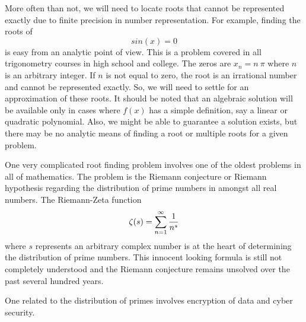 \documentclass[10pt,fleqn]{article}
\begin{document}
More often than not, we will need to locate roots that cannot be represented
exactly due to finite precision in number representation. For example, finding
the roots of
$$
  sin(x)=0
$$
is easy from an analytic point of view. This is a problem covered in all
trigonometry courses in high school and college. The zeros are $x_n=n\ \pi$
where $n$ is an arbitrary integer. If $n$ is not equal to zero, the root is an
irrational number and cannot be represented exactly. So, we will need to settle
for an approximation of these roots. It should be noted that an algebraic
solution will be available only in cases where $f(x)$ has a simple definition,
say a linear or quadratic polynomial. Also, we might be able to guarantee a
solution exists, but there may be no analytic means of finding a root or
multiple roots for a given problem.

One very complicated root finding problem involves one of the oldest problems
in all of mathematics. The problem is the Riemann conjecture or Riemann
hypothesis regarding the distribution of prime numbers in amongst all real
numbers. The Riemann-Zeta function
$$
  \zeta(s) = \sum_{n=1}^\infty {1\over{n^s}}
$$
where $s$ represents an arbitrary complex number is at the heart of determining
the distribution of prime numbers. This innocent looking formula is still not
completely understood and the Riemann conjecture remains unsolved over the past
several hundred years.

One related to the distribution of primes involves encryption of data and cyber
security.
\end{document}
